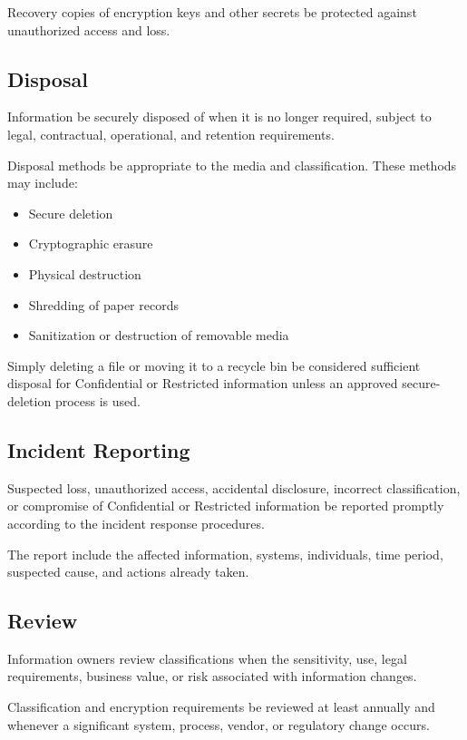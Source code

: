 Recovery copies of encryption keys and other secrets \must{} be protected against unauthorized access and loss.

\subsection{Disposal}

Information \must{} be securely disposed of when it is no longer required, subject to legal, contractual, operational, and retention requirements.

Disposal methods \must{} be appropriate to the media and classification. These methods may include:
\begin{itemize}
    \item Secure deletion
    \item Cryptographic erasure
    \item Physical destruction
    \item Shredding of paper records
    \item Sanitization or destruction of removable media
\end{itemize}

Simply deleting a file or moving it to a recycle bin \mustnot{} be considered sufficient disposal for Confidential or Restricted information unless an approved secure-deletion process is used.

\subsection{Incident Reporting}

Suspected loss, unauthorized access, accidental disclosure, incorrect classification, or compromise of Confidential or Restricted information \must{} be reported promptly according to the incident response procedures.

The report \should{} include the affected information, systems, individuals, time period, suspected cause, and actions already taken.

\subsection{Review}

Information owners \must{} review classifications when the sensitivity, use, legal requirements, business value, or risk associated with information changes.

Classification and encryption requirements \should{} be reviewed at least annually and whenever a significant system, process, vendor, or regulatory change occurs.